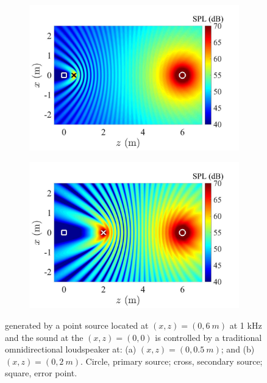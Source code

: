 \begin{figure}[!htb]
    \centering
    \begin{subfigure}{0.49\textwidth}
        \centering
        \includegraphics[width = 1\textwidth]{fig/cal_ANC_demo_On_1kHz_SecPointMonopole_dse0p5m_resize.jpg}
        \caption{}
    \end{subfigure}
    \begin{subfigure}{0.49\textwidth}
        \centering
        \includegraphics[width = 1\textwidth]{fig/cal_ANC_demo_On_1kHz_SecPointMonopole_dse2m_resize.jpg}
        \caption{}
    \end{subfigure}
    \caption{ generated by a point source located at $(x,z) = (0,\SI{6}{m})$ at 1 kHz and the sound at the $(x,z) = (0,0)$ is controlled by a traditional omnidirectional loudspeaker at: (a) $(x,z) = (0, \SI{0.5}{m})$; and (b) $(x,z) = (0,\SI{2}{m})$. Circle, primary source; cross, secondary source; square, error point.}
    \label{fig:anc_change_dist}
\end{figure}

